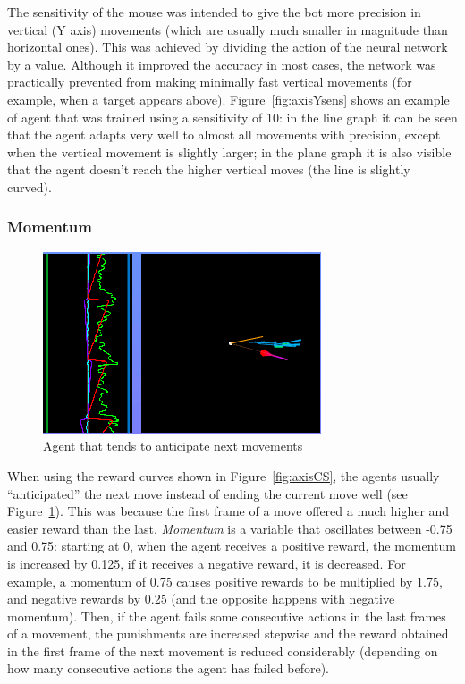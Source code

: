 The sensitivity of the mouse was intended to give the bot more precision in vertical (Y axis) movements (which are usually much smaller in magnitude than horizontal ones). This was achieved by dividing the action of the neural network by a value. Although it improved the accuracy in most cases, the network was practically prevented from making minimally fast vertical movements (for example, when a target appears above). Figure~\ref{fig:axisYsens} shows an example of agent that was trained using a sensitivity of 10: in the line graph it can be seen that the agent adapts very well to almost all movements with precision, except when the vertical movement is slightly larger; in the plane graph it is also visible that the agent doesn't reach the higher vertical moves (the line is slightly curved).

\subsubsection{Momentum}

\begin{figure}[h]
  \centering
		\includegraphics[width=.6\textwidth]{img/axisMomentum.png}
  \caption{Agent that tends to anticipate next movements}
  \label{fig:axisMomentum}
\end{figure}

When using the reward curves shown in Figure~\ref{fig:axisCS}, the agents usually ``anticipated'' the next move instead of ending the current move well (see Figure~\ref{fig:axisMomentum}). This was because the first frame of a move offered a much higher and easier reward than the last. \emph{Momentum} is a variable that oscillates between -0.75 and 0.75: starting at 0, when the agent receives a positive reward, the momentum is increased by 0.125, if it receives a negative reward, it is decreased. For example, a momentum of 0.75 causes positive rewards to be multiplied by 1.75, and negative rewards by 0.25 (and the opposite happens with negative momentum). Then, if the agent fails some consecutive actions in the last frames of a movement, the punishments are increased stepwise and the reward obtained in the first frame of the next movement is reduced considerably (depending on how many consecutive actions the agent has failed before).

